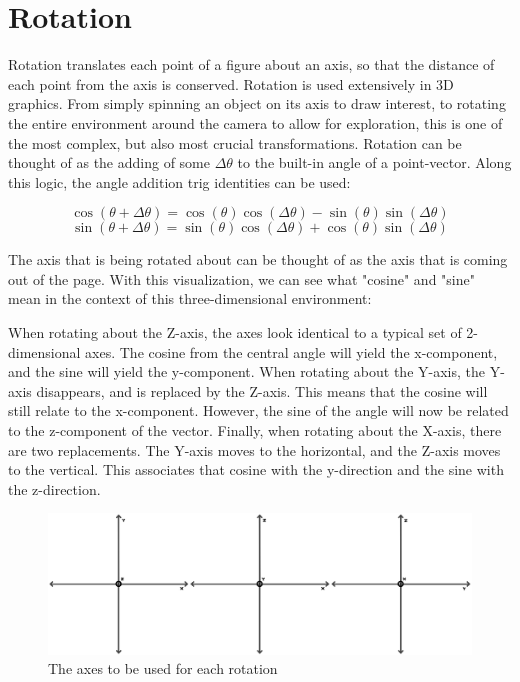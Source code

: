 \documentclass{article}
\begin{document}
	\section{Rotation}

	Rotation translates each point of a figure about an axis, so that the distance of each point from the axis is conserved. Rotation is used extensively in 3D graphics. From simply spinning an object on its axis to draw interest, to rotating the entire environment around the camera to allow for exploration, this is one of the most complex, but also most crucial transformations. Rotation can be thought of as the adding of some $\Delta\theta$ to the built-in angle of a point-vector. Along this logic, the angle addition trig identities can be used: \par
	\[\cos(\theta + \Delta\theta) = \cos(\theta)\cos(\Delta\theta) - \sin(\theta)\sin(\Delta\theta)\]
	\[\sin(\theta + \Delta\theta) = \sin(\theta)\cos(\Delta\theta) + \cos(\theta)\sin(\Delta\theta)\]
	
	The axis that is being rotated about can be thought of as the axis that is coming out of the page. With this visualization, we can see what "cosine" and "sine" mean in the context of this three-dimensional environment: \par

	When rotating about the Z-axis, the axes look identical to a typical set of 2-dimensional axes. The cosine from the central angle will yield the x-component, and the sine will yield the y-component. When rotating about the Y-axis, the Y-axis disappears, and is replaced by the Z-axis. This means that the cosine will still relate to the x-component. However, the sine of the angle will now be related to the z-component of the vector. Finally, when rotating about the X-axis, there are two replacements. The Y-axis moves to the horizontal, and the Z-axis moves to the vertical. This associates that cosine with the y-direction and the sine with the z-direction. \par
		\begin{figure}[H]
			\centering
			\includegraphics[width=0.85\linewidth]{img/axes.png}
			\caption{The axes to be used for each rotation}
		\end{figure}
\end{document}
